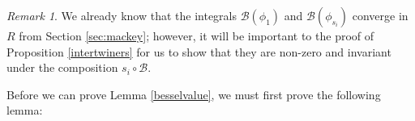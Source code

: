 \documentclass[11pt,letterpaper]{article}
\newcommand{\calB}{\mathcal{B}}
\newcommand{\ve}{\varepsilon}
\newcommand{\goth}{\mathfrak}
\theoremstyle{remark}
\newtheorem*{remark}{Remark}
\numberwithin{equation}{section}
\begin{document}
\begin{remark}
We already know that the integrals $\calB(\phi_1)$ and $\calB(\phi_{s_i})$ converge in $R$ from Section \ref{sec:mackey}; however, it will be important to the proof of Proposition \ref{intertwiners} for us to show that they are non-zero and invariant under the composition $s_i \circ \calB$.
\end{remark}

Before we can prove Lemma \ref{besselvalue}, we must first prove the following lemma:



\end{document}
